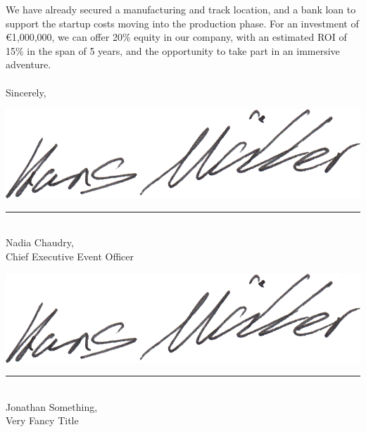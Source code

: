 \begin{newlfm}
We have already secured a manufacturing and track location, and a bank loan to support the startup costs moving into the production phase. For an investment of €1,000,000, we can offer 20\% equity in our company, with an estimated ROI of 15\% in the span of 5 years, and the opportunity to take part in an immersive adventure. 
\\
\\
\hspace{1in}
Sincerely,\\
\begin{multicols}{3}
[]
\includegraphics[scale=0.7]{test_signature.png}
\\
\noindent\rule{5cm}{0.4pt}
\\
Nadia Chaudry, \\Chief Executive Event Officer

\columnbreak
\includegraphics[scale=0.7]{test_signature.png}
\\
\rule{5cm}{0.4pt}
\\
Jonathan Something, \\Very Fancy Title

\end{multicols}
\end{newlfm}


